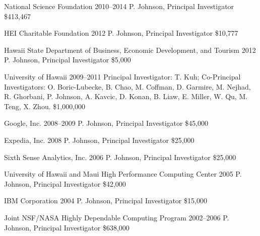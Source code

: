 \documentclass[11pt,letterpaper,sans]{moderncv} %
\begin{document}
        {National Science Foundation} %
        {2010--2014} %
        {P. Johnson, Principal Investigator}  %
        {\$413,467} %

            {HEI Charitable Foundation}
            {2012}
            {P. Johnson, Principal Investigator}
            {\$10,777}

            {Hawaii State Department of Business, Economic Development, and Tourism} %
            {2012} %
            {P. Johnson, Principal Investigator}  %
            {\$5,000} %

        {University of Hawaii} %
        {2009--2011} %
        {Principal Investigator: T. Kuh; Co-Principal Investigators:  O. Boric-Lubecke, B. Chao, M. Coffman, D. Garmire, M. Nejhad, R. Ghorbani, P. Johnson, A. Kavcic, D. Konan, B. Liaw, E. Miller, W. Qu, M. Teng, X. Zhou.}  %
        {\$1,000,000} %

        {Google, Inc.} %
        {2008--2009} %
        {P. Johnson, Principal Investigator}  %
        {\$45,000} %

        {Expedia, Inc.} %
        {2008} %
        {P. Johnson, Principal Investigator}  %
        {\$25,000} %

        {Sixth Sense Analytics, Inc.} %
        {2006} %
        {P. Johnson, Principal Investigator}  %
        {\$25,000} %

        {University of Hawaii and Maui High Performance Computing Center} %
        {2005} %
        {P. Johnson, Principal Investigator}  %
        {\$42,000} %

        {IBM Corporation} %
        {2004} %
        {P. Johnson, Principal Investigator}  %
        {\$15,000} %

        {Joint NSF/NASA Highly Dependable Computing Program} %
        {2002--2006} %
        {P. Johnson, Principal Investigator}  %
        {\$638,000} %
\end{document}

